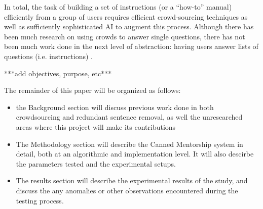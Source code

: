 In total, the task of building a set of instructions (or a ``how-to'' manual) efficiently from a group of users requires efficient crowd-sourcing techniques as well as sufficiently sophisticated AI to augment this process.
Although there has been much research on using crowds to answer single questions, there has not been much work done in the next level of abstraction: having users answer lists of questions (i.e. instructions) \cite{lasecki2013chorus,bigham2010vizwiz}.

***add objectives, purpose, etc***

The remainder of this paper will be organized as follows:
\begin{itemize}
	\item the Background section will discuss previous work done in both crowdsourcing and redundant sentence removal, as well the unresearched areas where this project will make its contributions
	
	\item The Methodology section will describe the Canned Mentorship system in detail, both at an algorithmic and implementation level. It will also descirbe the parameters tested and the experimental setups.
	
	\item The results section will describe the experimental results of the study, and discuss the any anomalies or other observations encountered during the testing process.
\end{itemize}
